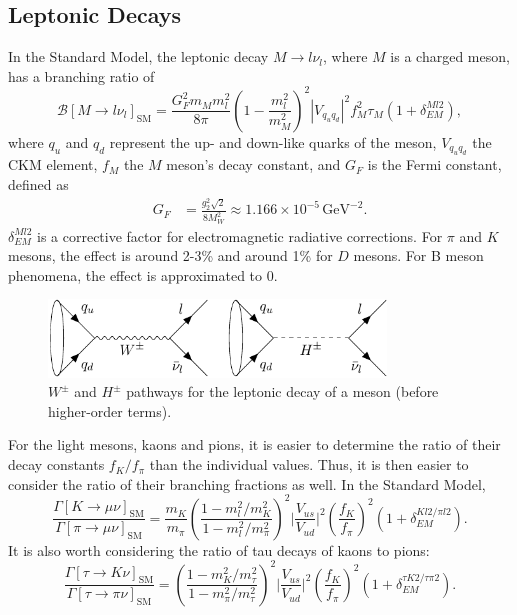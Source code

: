 \documentclass[a4paper,12pt]{article}
\begin{document}
\subsection{Leptonic Decays}
\label{subsec:lep}
In the Standard Model, the leptonic decay $M\to l\nu_l$, where $M$ is a charged meson, has a branching ratio of
\begin{equation}
    \label{eq:mlv}
    \mathcal{B}[M\to l\nu_l]_{\text{SM}} = \frac{G_F^2m_Mm_l^2}{8\pi}\left(1-\frac{m_l^2}{m_M^2}\right)^2 |V_{q_uq_d}|^2f_M^2\tau_M(1+\delta_{EM}^{Ml2}),
\end{equation}
where $q_u$ and $q_d$ represent the up- and down-like quarks of the meson, $V_{q_uq_d}$ the CKM element, $f_M$ the $M$ meson's decay constant, and $G_F$ is the Fermi constant, defined as
\begin{align}
    G_F &= \frac{g_2^2\sqrt{2}}{8M_W^2} \approx 1.166\times10^{-5}\,\text{GeV}^{-2}.
\end{align}
$\delta_{EM}^{Ml2}$ is a corrective factor for electromagnetic radiative corrections. 
For $\pi$ and $K$ mesons, the effect is around 2-3\% and around 1\% for $D$ mesons.
For B meson phenomena, the effect is approximated to 0. 
\begin{figure}[H]
    \centering
    \includegraphics[width=0.8\textwidth]{mesons.pdf}
    \caption{\label{fig:mesons}$W^\pm$ and $H^\pm$ pathways for the leptonic decay of a meson (before higher-order terms).}
\end{figure}
For the light mesons, kaons and pions, it is easier to determine the ratio of their decay constants $f_K/f_\pi$ than the individual values.
Thus, it is then easier to consider the ratio of their branching fractions as well. 
In the Standard Model, 
\begin{equation}
    \label{eq:kpi}
    \frac{\Gamma[K\to\mu\nu]_{\text{SM}}}{\Gamma[\pi\to\mu\nu]_{\text{SM}}} = \frac{m_K}{m_\pi}\left(\frac{1-m_l^2/m_K^2}{1-m_l^2/m_\pi^2}\right)^2 \bigg|\frac{V_{us}}{V_{ud}}\bigg|^2\left(\frac{f_K}{f_\pi}\right)^2(1+\delta^{Kl2/\pi l2}_{EM}).
\end{equation}
It is also worth considering the ratio of tau decays of kaons to pions:
\begin{equation}
    \label{ep:tkpi}
    \frac{\Gamma[\tau\to K\nu]_{\text{SM}}}{\Gamma[\tau\to\pi\nu]_{\text{SM}}} = \left(\frac{1-m_K^2/m_\tau^2}{1-m_\pi^2/m_\tau^2}\right)^2\bigg|\frac{V_{us}}{V_{ud}}\bigg|^2\left(\frac{f_K}{f_\pi}\right)^2(1+\delta_{EM}^{\tau K2/\tau\pi2}).
\end{equation}
\end{document}
